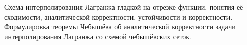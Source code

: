 \documentclass[__main__.tex]{subfiles}
\begin{document}
Схема интерполирования Лагранжа гладкой на отрезке функции, понятия её сходимости, аналитической корректности, устойчивости и корректности. Формулировка теоремы Чебышёва об аналитической корректности задачи интерполирования Лагранжа со схемой чебышёвских сеток.
\end{document}
